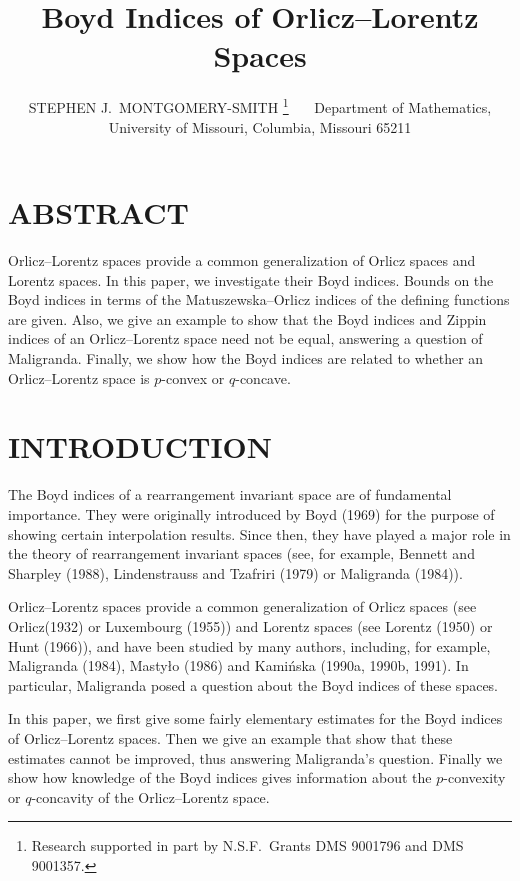 \title{Boyd Indices of Orlicz--Lorentz Spaces}

\author{STEPHEN J.~MONTGOMERY-SMITH%
\thanks
{Research supported in part by N.S.F.\ Grants DMS 9001796 and DMS 9001357.}
\ \ \
Department of Mathematics, University of Missouri,
Columbia, Missouri 65211}

\maketitle

\thispagestyle{empty}
\pagestyle{empty}

\section*{ABSTRACT}

Orlicz--Lorentz spaces 
provide a common generalization of Orlicz spaces 
and
Lorentz spaces. In this paper, we investigate their Boyd indices. Bounds
on the Boyd indices in terms of the Matuszewska--Orlicz indices of the 
defining
functions are given. Also, we give an example to show that the Boyd indices
and Zippin indices of an Orlicz--Lorentz space need not be equal, answering a
question of Maligranda.  Finally, we show how the Boyd indices are related to
whether an Orlicz--Lorentz space is $p$-convex or $q$-concave. 


\section{INTRODUCTION}

The Boyd indices of a rearrangement invariant space are of fundamental
importance. They were originally introduced by Boyd (1969) for the purpose
of showing certain interpolation results. Since then, they have played a 
major
role in the theory of rearrangement invariant spaces (see, for example,
Bennett and Sharpley (1988), Lindenstrauss and Tzafriri (1979) or 
Maligranda (1984)).

Orlicz--Lorentz spaces provide a common generalization of Orlicz spaces (see
Orlicz(1932) or Luxembourg (1955)) and 
Lorentz spaces (see Lorentz (1950) or 
Hunt (1966)), and have been
studied by many authors, including, for example, Maligranda (1984), Masty\l o
(1986) and Kami\'nska (1990a, 1990b, 1991). In particular,
Maligranda posed a question about the Boyd indices of these spaces. 

In this paper, we first give some
fairly elementary estimates for the Boyd indices of Orlicz--Lorentz 
spaces. Then we
give an example that show that
these estimates cannot be improved, thus answering 
Maligranda's question. Finally we show how knowledge of the Boyd indices
gives information about the $p$-convexity or $q$-concavity of the 
Orlicz--Lorentz
space.

